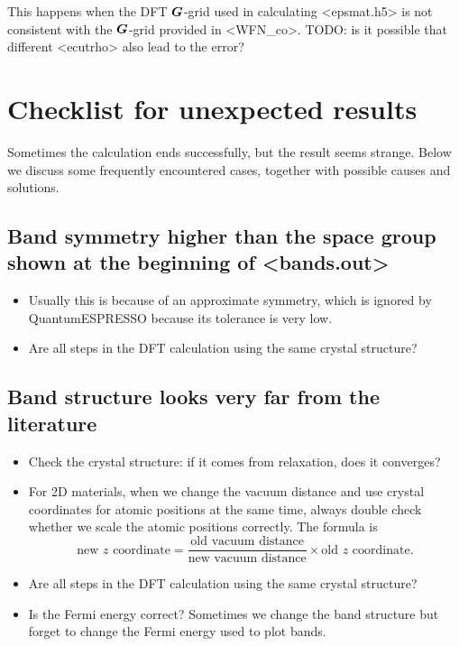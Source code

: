\documentclass[hyperref, a4paper, 12pt]{report}
\def\texttt#1{<#1>}%
\newcommand{\shortcode}[1]{\texttt{#1}}
\begin{document}
This happens when the DFT $\vb*{G}$-grid used in calculating \shortcode{epsmat.h5} 
is not consistent with the $\vb*{G}$-grid provided in \shortcode{WFN_co}.
TODO: is it possible that different \shortcode{ecutrho} also lead to the error? 

\section{Checklist for unexpected results}

Sometimes the calculation ends successfully,
but the result seems strange.
Below we discuss some frequently encountered cases, 
together with possible causes and solutions. 

\subsection{Band symmetry higher than the space group shown at the beginning of \shortcode{bands.out}}

\begin{itemize}
    \item Usually this is because of an approximate symmetry,
    which is ignored by QuantumESPRESSO because its tolerance is very low.
    \item Are all steps in the DFT calculation using the same crystal structure?
\end{itemize}

\subsection{Band structure looks very far from the literature}

\begin{itemize}
    \item Check the crystal structure: if it comes from relaxation,
    does it converges?
    \item For 2D materials, 
    when we change the vacuum distance
    and use crystal coordinates for atomic positions at the same time, 
    always double check whether we scale the atomic positions correctly.
    The formula is 
    \begin{equation}
        \text{new $z$ coordinate} = \frac{\text{old vacuum distance}}{\text{new vacuum distance}} \times \text{old $z$ coordinate}.
    \end{equation}
    \item Are all steps in the DFT calculation using the same crystal structure?
    \item Is the Fermi energy correct? 
    Sometimes we change the band structure but forget to change the Fermi energy used to plot bands.
\end{itemize}
\end{document}
